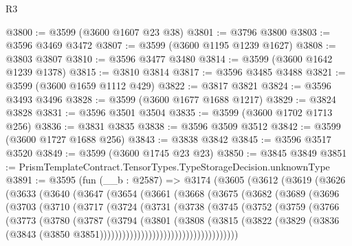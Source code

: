 \begin{lexlean}{R3}
\begin{coremodule}
@3800 := @3599 (@3600 @1607 @23 @38)
@3801 := @3796 @3800
@3803 := @3596 @3469 @3472
@3807 := @3599 (@3600 @1195 @1239 @1627)
@3808 := @3803 @3807
@3810 := @3596 @3477 @3480
@3814 := @3599 (@3600 @1642 @1239 @1378)
@3815 := @3810 @3814
@3817 := @3596 @3485 @3488
@3821 := @3599 (@3600 @1659 @1112 @429)
@3822 := @3817 @3821
@3824 := @3596 @3493 @3496
@3828 := @3599 (@3600 @1677 @1688 @1217)
@3829 := @3824 @3828
@3831 := @3596 @3501 @3504
@3835 := @3599 (@3600 @1702 @1713 @256)
@3836 := @3831 @3835
@3838 := @3596 @3509 @3512
@3842 := @3599 (@3600 @1727 @1688 @256)
@3843 := @3838 @3842
@3845 := @3596 @3517 @3520
@3849 := @3599 (@3600 @1745 @23 @23)
@3850 := @3845 @3849
@3851 := PrismTemplateContract.TensorTypes.TypeStorageDecision.unknownType
@3891 := @3595
    (fun (__b : @2587) =>
    @3174
      (@3605
        (@3612
          (@3619
            (@3626
              (@3633
                (@3640
                  (@3647
                    (@3654
                      (@3661
                        (@3668
                          (@3675
                            (@3682
                              (@3689
                                (@3696
                                  (@3703
                                    (@3710
                                      (@3717
                                        (@3724
                                          (@3731
                                            (@3738
                                              (@3745
                                                (@3752
                                                  (@3759
                                                    (@3766
                                                      (@3773
                                                        (@3780
                                                          (@3787
                                                            (@3794
                                                              (@3801
                                                                (@3808
                                                                  (@3815
                                                                    (@3822
                                                                      (@3829
                                                                        (@3836
                                                                          (@3843
                                                                            (@3850
                                                                              @3851)))))))))))))))))))))))))))))))))))))

\end{coremodule}
\end{lexlean}

